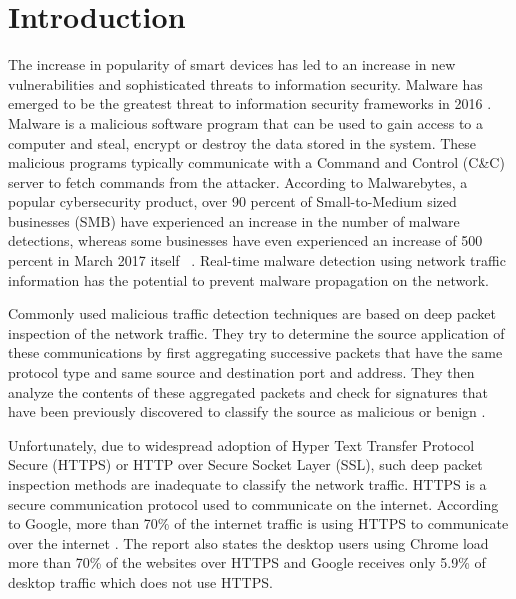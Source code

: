 \chapter{Introduction\label{chap:intro}}

The increase in popularity of smart devices has led to an increase in new vulnerabilities and sophisticated threats to information security. Malware has emerged to be the greatest threat to information security frameworks in 2016 . Malware is a malicious software program that can be used to gain access to a computer and steal, encrypt or destroy the data stored in the system. These malicious programs typically communicate with a Command and Control (C\&C) server to fetch commands from the attacker. According to Malwarebytes, a popular cybersecurity product, over 90 percent of Small-to-Medium sized businesses (SMB) have experienced an increase in the number of malware detections, whereas some businesses have even experienced an increase of 500 percent in March 2017 itself ~\cite{Malwarebytes17}. Real-time malware detection using network traffic information has the potential to prevent malware propagation on the network.

Commonly used malicious traffic detection techniques are based on deep packet inspection of the network traffic. They try to determine the source application of these communications by first aggregating successive packets that have the same protocol type and same source and destination port and address. They then analyze the contents of these aggregated packets and check for signatures that have been previously discovered to classify the source as malicious or benign \cite{SenSW04}.

Unfortunately, due to widespread adoption of Hyper Text Transfer Protocol Secure (HTTPS) or HTTP over Secure Socket Layer (SSL), such deep packet inspection methods are inadequate to classify the network traffic. HTTPS is a secure communication protocol used to communicate on the internet. According to Google, more than 70\% of the internet traffic is using HTTPS to communicate over the internet \cite{Google17}. The report also states the desktop users using Chrome load more than 70\% of the websites over HTTPS and Google receives only 5.9\% of desktop traffic which does not use HTTPS.

